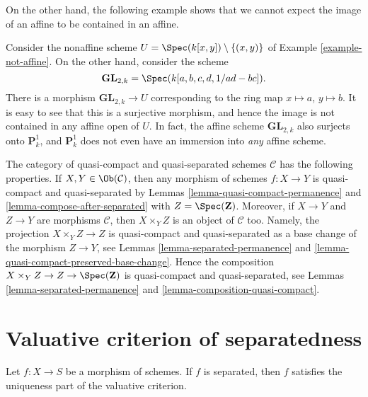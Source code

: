 \noindent
On the other hand, the following example shows that we cannot
expect the image of an affine to be contained in an affine.

\begin{example}
\label{example-image-affine-projective}
Consider the nonaffine scheme
$U = \Spec(k[x, y]) \setminus \{(x, y)\}$ of
Example \ref{example-not-affine}. On the other hand, consider the
scheme
$$
\mathbf{GL}_{2, k} = \Spec(k[a, b, c, d, 1/ad - bc]).
$$
There is a morphism $\mathbf{GL}_{2, k} \to U$ corresponding
to the ring map $x \mapsto a$, $y \mapsto b$. It is easy to see that
this is a surjective morphism, and hence the image is not contained
in any affine open of $U$. In fact, the affine scheme
$\mathbf{GL}_{2, k}$ also surjects onto $\mathbf{P}^1_k$, and
$\mathbf{P}^1_k$ does not even have an immersion into {\it any} affine scheme.
\end{example}

\begin{remark}
\label{remark-quasi-compact-and-quasi-separated}
The category of quasi-compact and quasi-separated schemes $\mathcal{C}$
has the following properties. If $X, Y \in \Ob(\mathcal{C})$, then any
morphism of schemes $f : X \to Y$ is quasi-compact and quasi-separated by
Lemmas \ref{lemma-quasi-compact-permanence} and
\ref{lemma-compose-after-separated}
with $Z = \Spec(\mathbf{Z})$. Moreover, if $X \to Y$ and $Z \to Y$
are morphisms $\mathcal{C}$, then $X \times_Y Z$ is an object of $\mathcal{C}$
too. Namely, the projection $X \times_Y Z \to Z$ is quasi-compact and
quasi-separated as a base change of the morphism $Z \to Y$, see
Lemmas \ref{lemma-separated-permanence} and
\ref{lemma-quasi-compact-preserved-base-change}.
Hence the composition $X \times_Y Z \to Z \to \Spec(\mathbf{Z})$
is quasi-compact and quasi-separated, see
Lemmas \ref{lemma-separated-permanence} and
\ref{lemma-composition-quasi-compact}.
\end{remark}





\section{Valuative criterion of separatedness}
\label{section-valuative-separatedness}

\begin{lemma}
\label{lemma-separated-implies-valuative}
Let $f : X \to S$ be a morphism of schemes.
If $f$ is separated, then $f$ satisfies the uniqueness
part of the valuative criterion.
\end{lemma}

